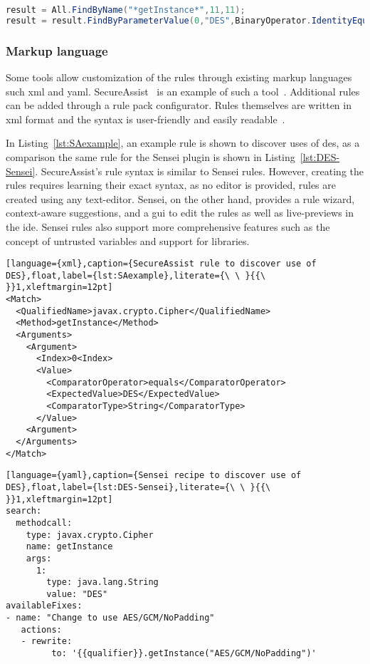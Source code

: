 \begin{lstlisting}[language={Java},caption={CxQuery query used by Checkmarx to find use of insecure algorithm DES.},label={lst:detectDES-checkmarx},abovecaptionskip=-0.0pt,xleftmargin=15pt]
result = All.FindByName("*getInstance*",11,11);
result = result.FindByParameterValue(0,"DES",BinaryOperator.IdentityEquality);
\end{lstlisting}

\subsubsection{Markup language}
Some tools allow customization of the rules through existing markup languages such \gls{xml} and \gls{yaml}.
SecureAssist~\cite{secureassist} is an example of such a tool~\cite{sastinide}. 
Additional rules can be added through a rule pack configurator.
Rules themselves are written in \gls{xml} format and the syntax is user-friendly and easily readable~\cite{secureassistruletutorial}.

In Listing~\ref{lst:SAexample}, an example rule is shown to discover uses of \gls{des}, as a comparison the same rule for the Sensei plugin is shown in Listing~\ref{lst:DES-Sensei}.
SecureAssist's rule syntax is similar to Sensei rules.
However, creating the rules requires learning their exact syntax, as no editor is provided, rules are created using any text-editor.
Sensei, on the other hand, provides a rule wizard, context-aware suggestions, and a \gls{gui} to edit the rules as well as live-previews in the \gls{ide}.
Sensei rules also support more comprehensive features such as the concept of untrusted variables and support for libraries.

\begin{lstlisting}[language={xml},caption={SecureAssist rule to discover use of DES},float,label={lst:SAexample},literate={\ \ }{{\ }}1,xleftmargin=12pt] 
<Match>
  <QualifiedName>javax.crypto.Cipher</QualifiedName>
  <Method>getInstance</Method>
  <Arguments>
    <Argument>
      <Index>0<Index>
      <Value>
        <ComparatorOperator>equals</ComparatorOperator>
        <ExpectedValue>DES</ExpectedValue>
        <ComparatorType>String</ComparatorType>
      </Value>
    <Argument>
  </Arguments>
</Match>
\end{lstlisting}

\begin{lstlisting}[language={yaml},caption={Sensei recipe to discover use of DES},float,label={lst:DES-Sensei},literate={\ \ }{{\ }}1,xleftmargin=12pt]
search:
  methodcall:
    type: javax.crypto.Cipher
    name: getInstance
    args:
      1:
        type: java.lang.String
        value: "DES"
availableFixes:
- name: "Change to use AES/GCM/NoPadding"
   actions:
   - rewrite:
         to: '{{qualifier}}.getInstance("AES/GCM/NoPadding")'
\end{lstlisting}

